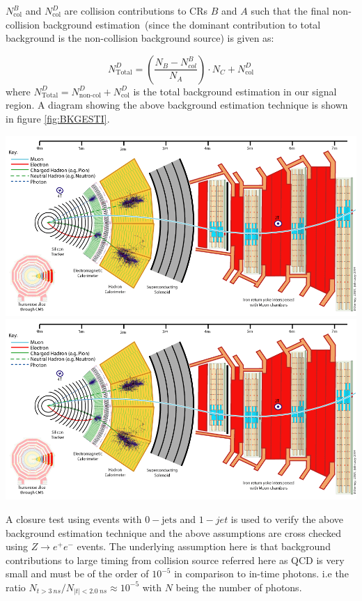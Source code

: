 $N^{B}_{\mbox{col}}$ and $N^{D}_{\mbox{col}}$ are collision contributions to  CRs $B$ and $A$ such that the final non-collision background estimation~(since the dominant contribution to total background  is the non-collision background source) is given as:

\begin{equation}
N^{D}_{\mbox{Total}} = \left(\frac{N_{B} - N^{B}_{col} }{N_{A}} \right)\cdot N_{C} + N^{D}_{\mbox{col}} 
\end{equation}
where $N^{D}_{\mbox{Total}} = N^{D}_{\mbox{non-col}} + N^{D}_{\mbox{col}}$ is the total background estimation in  our signal region.
A diagram showing the above background estimation technique is shown in figure \ref{fig:BKGESTI}.
\begin{center}
\centering
\includegraphics[scale=0.2]{THESISPLOTS/CMS_Slice.png}
\includegraphics[scale=0.2]{THESISPLOTS/CMS_Slice.png}
\label{fig:BKGESTI}
\end{center}

A closure test using events with $0-\mbox{jets}$ and $1-jet$ is used to verify the above  background estimation technique and the above assumptions are cross checked using $Z\rightarrow e^{+} e^{-}$ events. 
The underlying assumption here is that background contributions to large timing from collision source referred here as QCD is very small and must be of the order of $10^{-5}$ in comparison to in-time photons. i.e the ratio 
$ N_{t > 3~ns}/ N_{|t| < 2.0~ns} \approx 10^{-5}$ with $N$ being the number of photons.

